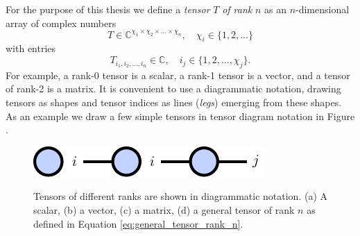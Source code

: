 For the purpose of this thesis we define a \textit{tensor} $T$ \textit{of rank} $n$ as an $n$-dimensional array of complex numbers
\begin{equation}
	\label{eq:general_tensor_rank_n}
	T \in \mathbb{C}^{\chi_1\times\chi_2\times\dots\times\chi_n}, \quad \chi_i \in \{1, 2, \dots\}
\end{equation}
with entries
\begin{equation}
	T_{i_1,i_2,\dots,i_n} \in \mathbb{C}, \quad i_j \in \{1, 2, \dots, \chi_j\}.
\end{equation}
For example, a rank-0 tensor is a scalar, a rank-1 tensor is a vector, and a tensor of rank-2 is a matrix. It is convenient to use a diagrammatic notation, drawing tensors as shapes and tensor indices as lines (\textit{legs}) emerging from these shapes. As an example we draw a few simple tensors in tensor diagram notation in Figure . \par
\begin{figure}[ht]
	\centering
	\subcaptionbox{\label{fig:basic_tensor_diagrams_scalar}}
	{%
		\raisebox{\dimexpr.5\ht\largestimage-.5\height}
		{%
			\includegraphics[scale=1]{figures/tikz/Tensor_Networks/basic_diagrams/basic_diagrams_a.pdf}
		}
	}
	\quad\quad
	\subcaptionbox{\label{fig:basic_tensor_diagrams_vector}}
	{%
		\raisebox{\dimexpr.5\ht\largestimage-.5\height}
		{%
			\includegraphics[scale=1]{figures/tikz/Tensor_Networks/basic_diagrams/basic_diagrams_b.pdf}
		}
	}
	\quad\quad
	\subcaptionbox{\label{fig:basic_tensor_diagrams_matrix}}
	{%
		\raisebox{\dimexpr.5\ht\largestimage-.5\height}
		{%
			\includegraphics[scale=1]{figures/tikz/Tensor_Networks/basic_diagrams/basic_diagrams_c.pdf}
		}
	}
	\quad\quad
	\subcaptionbox{\label{fig:basic_tensor_diagrams_rank_n_tensor}}
	{%
		\usebox{\largestimage}
	}
\caption{Tensors of different ranks are shown in diagrammatic notation. (a) A scalar, (b) a vector, (c) a matrix, (d) a general tensor of rank $n$ as defined in Equation \eqref{eq:general_tensor_rank_n}.}
\label{fig:basic_tensor_diagrams}
\end{figure}
